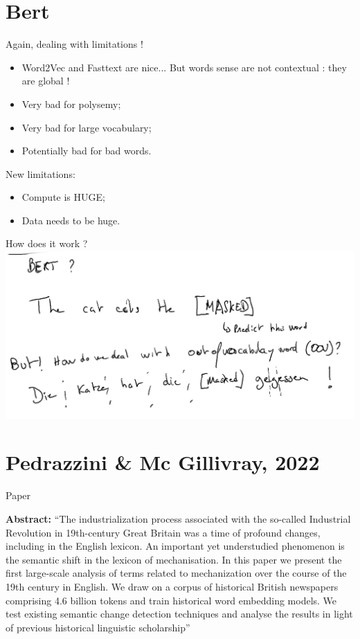 \documentclass[aspectratio=169]{beamer}
\begin{document}
\section{Bert}

\begin{frame}{Again, dealing with limitations !}
    \begin{itemize}
        \item Word2Vec and Fasttext are nice... But words sense are not contextual : they are global !
        \item Very bad for polysemy;
        \item Very bad for large vocabulary;
        \item Potentially bad for bad words.
    \end{itemize}
    New limitations:
    \begin{itemize}
        \item Compute is HUGE;
        \item Data needs to be huge.
    \end{itemize}
\end{frame}

\begin{frame}{How does it work ?}
    \centering
    \includegraphics[width=.9\linewidth]{nlp-for-ch/images/bert.png}
\end{frame}

\section{Pedrazzini \& Mc Gillivray, 2022}

\begin{frame}{Paper}
    \vspace{1em}
    
    \small \textbf{Abstract:} ``The industrialization process associated with the so-called Industrial Revolution in 19th-century Great Britain was a time of profound changes, including in the English lexicon. An important yet understudied phenomenon is the semantic shift in the lexicon of mechanisation. In this paper we present the first large-scale analysis of terms related to mechanization over the course of the 19th century in English. We draw on a corpus of historical British newspapers comprising 4.6 billion tokens and train historical word embedding models. We test existing semantic change detection techniques and analyse the results in light of previous historical linguistic scholarship''
\end{frame}
\end{document}
